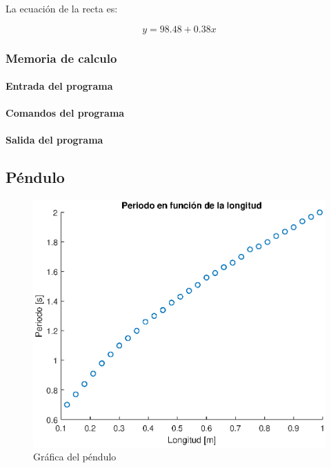 \documentclass[letter,11pt]{article}
\begin{document}
La ecuación de la recta es:

\begin{equation}
    y = 98.48 + 0.38 x
\end{equation}

\subsubsection{Memoria de calculo}

\paragraph{Entrada del programa}
\begin{alltt}
\footnotesize

\normalsize
\end{alltt}

\paragraph{Comandos del programa}
\begin{alltt}
\footnotesize

\normalsize
\end{alltt}

\paragraph{Salida del programa}
\begin{alltt}
\footnotesize

\normalsize
\end{alltt}

\subsection{Péndulo}
\begin{figure}[!h]
\centering
\includegraphics[scale=1.00]{resources/3.4.1.eps}
\caption{Gráfica del péndulo}
\label{practica34}
\end{figure}
\end{document}
